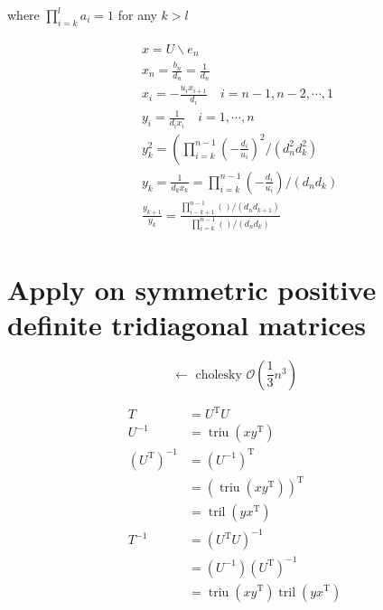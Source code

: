 \documentclass[11pt]{article}
\newcommand{\triu}{\mathop{\mathrm{triu}}}
\newcommand{\tril}{\mathop{\mathrm{tril}}}
\newcommand{\T}{\mathrm{T}}
\begin{document}
where $\prod_{i=k}^{l} a_i = 1$ for any $k > l$


\begin{align*}
    \begin{aligned}
    &x=U \backslash e_n\\
    &x_n=\frac{b_n}{d_n}=\frac{1}{d_n}\\
    &x_i=-\frac{u_i x_{i+1}}{d_i} \quad i=n-1, n-2, \cdots, 1\\
    &y_i=\frac{1}{d_i x_i} \quad i=1, \cdots, n\\
    &y_k^2=\left(\prod_{i=k}^{n-1}\left(-\frac{d_i}{u_i}\right)^2 /\left(d_n^2 d_k^2\right)\right.\\
    &y_k=\frac{1}{d_k x_k}=\prod_{i=k}^{n-1}\left(-\frac{d_i}{u_i}\right) /\left(d_n d_k\right)\\
    &\frac{y_{k+1}}{y_k}=\frac{\prod_{i-k+1}^{n-1}() /\left(d_n d_{k+1}\right)}{\prod_{i=k}^{n-1}() /\left(d_n d_k\right)}
    \end{aligned}
\end{align*}



\newpage

\section{Apply on symmetric positive definite tridiagonal matrices}
$$\longleftarrow \text { cholesky } \mathcal{O}\left(\frac{1}{3} n^{3}\right)$$

\begin{align*}
    T &= U^{\T} U \\
    U^{-1} &= \triu\left(x y^{\T}\right) \\
    \left(U^{\T}\right)^{-1} &= \left(U^{-1}\right)^{\T} \\
        &=\left(\triu \left(x y^{\T}\right)\right)^{\T} \\
        &= \tril\left(y x^{\T}\right) \\
    T^{-1} &= \left(U^{\T} U\right)^{-1} \\
        &= \left(U^{-1}\right)\left(U^{\T}\right)^{-1} \\
        &= \triu \left(x y^{\T}\right) \tril \left(y x^{\T}\right) 
\end{align*}
\end{document}
